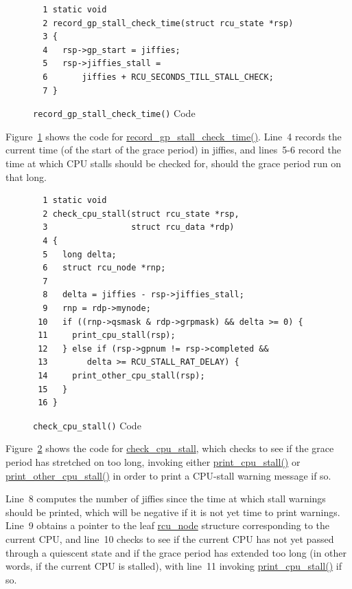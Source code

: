 \begin{figure}[tbp]
{ \scriptsize
\begin{verbatim}
  1 static void
  2 record_gp_stall_check_time(struct rcu_state *rsp)
  3 {
  4   rsp->gp_start = jiffies;
  5   rsp->jiffies_stall =
  6       jiffies + RCU_SECONDS_TILL_STALL_CHECK;
  7 }
\end{verbatim}
}
\caption{{\tt record\_gp\_stall\_check\_time()} Code}
\label{fig:app:rcuimpl:rcutreewt:Code for record-gp-stall-check-time}
\end{figure}

Figure~\ref{fig:app:rcuimpl:rcutreewt:Code for record-gp-stall-check-time}
shows the code for \url{record_gp_stall_check_time()}.
Line~4 records the current time (of the start of the grace period)
in jiffies, and lines~5-6 record the time at which CPU stalls should
be checked for, should the grace period run on that long.

\begin{figure}[tbp]
{ \scriptsize
\begin{verbatim}
  1 static void
  2 check_cpu_stall(struct rcu_state *rsp,
  3                 struct rcu_data *rdp)
  4 {
  5   long delta;
  6   struct rcu_node *rnp;
  7 
  8   delta = jiffies - rsp->jiffies_stall;
  9   rnp = rdp->mynode;
 10   if ((rnp->qsmask & rdp->grpmask) && delta >= 0) {
 11     print_cpu_stall(rsp);
 12   } else if (rsp->gpnum != rsp->completed &&
 13        delta >= RCU_STALL_RAT_DELAY) {
 14     print_other_cpu_stall(rsp);
 15   }
 16 }
\end{verbatim}
}
\caption{{\tt check\_cpu\_stall()} Code}
\label{fig:app:rcuimpl:rcutreewt:Code for check-cpu-stall}
\end{figure}

Figure~\ref{fig:app:rcuimpl:rcutreewt:Code for check-cpu-stall}
shows the code for \url{check_cpu_stall}, which checks to see
if the grace period has stretched on too long, invoking either
\url{print_cpu_stall()} or \url{print_other_cpu_stall()} in order
to print a CPU-stall warning message if so.

Line~8 computes the number of jiffies since the time at which stall
warnings should be printed, which will be negative if it is not
yet time to print warnings.
Line~9 obtains a pointer to the leaf \url{rcu_node}
structure corresponding to the current CPU,
and line~10 checks to see if the current CPU has not yet passed through
a quiescent state and if the grace period has extended too long
(in other words, if the current CPU is stalled),
with line~11 invoking \url{print_cpu_stall()} if so.

